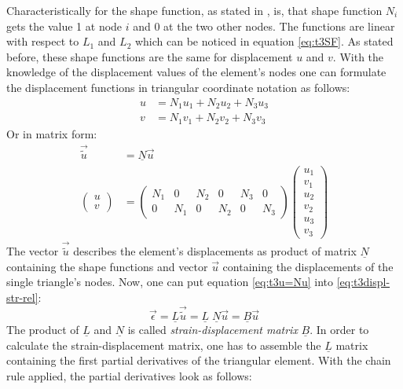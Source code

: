   Characteristically for the shape function, as stated in \cite{steinke2005finite}, is, that shape function $N_i$ gets the value 1 at node $i$ and 0 at the two other nodes. The functions are linear with respect to $L_1$ and $L_2$ which can be noticed in equation \ref{eq:t3SF}. As stated before, these shape functions are the same for displacement $u$ and $v$. With the knowledge of the displacement values of the element's nodes one can formulate the displacement functions in triangular coordinate notation as follows:
  \begin{align}
  u &= N_1 u_1 + N_2 u_2 + N_3 u_3 \nonumber\\
  v &= N_1 v_1 + N_2 v_2 + N_3 v_3
  \end{align}
  Or in matrix form:
  \begin{align} \label{eq:t3u=Nu}
  \vec{\tilde{u}} &= \underline{N} \vec{u} \nonumber\\
  \begin{pmatrix}
  u \\ v
  \end{pmatrix} &= \begin{pmatrix}
  N_1 & 0 & N_2 & 0 & N_3 & 0 \\
  0 & N_1 & 0 & N_2 & 0 & N_3
  \end{pmatrix} \begin{pmatrix}
  u_1 \\ v_1 \\ u_2 \\ v_2 \\ u_3 \\ v_3
  \end{pmatrix}
  \end{align}
  The vector $\vec{\tilde{u}}$ describes the element's displacements as product of matrix $\underline{N}$ containing the shape functions and vector $\vec{u}$ containing the displacements of the single triangle's nodes. Now, one can put equation \ref{eq:t3u=Nu} into \ref{eq:t3displ-str-rel}:
  \begin{equation}\label{eq:t3eps=Bu}
  \vec{\epsilon} = \underline{L}\vec{\tilde{u}} = \underline{L}\;\underline{N} \vec{u} = \underline{B} \vec{u}
  \end{equation}
  The product of $\underline{L}$ and $\underline{N}$ is called \textit{strain-displacement matrix} $\underline{B}$.
  In order to calculate the strain-displacement matrix, one has to assemble the $\underline{L}$ matrix containing the first partial derivatives of the triangular element. With the chain rule applied, the partial derivatives look as follows:
